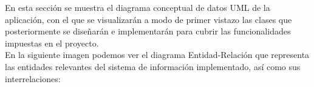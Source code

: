 En esta sección se muestra el diagrama conceptual de datos UML de la aplicación, con el que se visualizarán a modo de primer vistazo las clases que posteriormente se diseñarán e implementarán para cubrir las funcionalidades impuestas en el proyecto.\\

En la siguiente imagen podemos ver el diagrama Entidad-Relación que representa las entidades relevantes del sistema de información implementado, así como sus interrelaciones:















